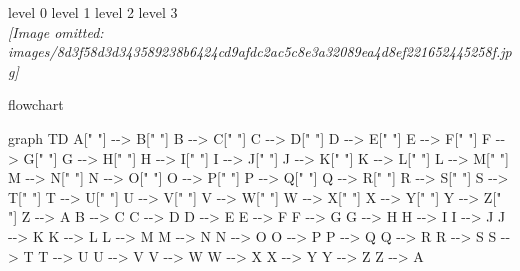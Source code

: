 \documentclass[
]{article}
\newenvironment{Shaded}{}{}
\newcommand{\NormalTok}[1]{#1}
\begin{document}
level 0 level 1 level 2 level 3\\
\textit{[Image omitted: images/8d3f58d3d343589238b6424cd9afdc2ac5c8e3a32089ea4d8ef221652445258f.jpg]}

flowchart

\begin{Shaded}
\begin{Highlighting}[]
\NormalTok{graph TD}
\NormalTok{    A[" "] {-}{-}\textgreater{} B[" "]}
\NormalTok{    B {-}{-}\textgreater{} C[" "]}
\NormalTok{    C {-}{-}\textgreater{} D[" "]}
\NormalTok{    D {-}{-}\textgreater{} E[" "]}
\NormalTok{    E {-}{-}\textgreater{} F[" "]}
\NormalTok{    F {-}{-}\textgreater{} G[" "]}
\NormalTok{    G {-}{-}\textgreater{} H[" "]}
\NormalTok{    H {-}{-}\textgreater{} I[" "]}
\NormalTok{    I {-}{-}\textgreater{} J[" "]}
\NormalTok{    J {-}{-}\textgreater{} K[" "]}
\NormalTok{    K {-}{-}\textgreater{} L[" "]}
\NormalTok{    L {-}{-}\textgreater{} M[" "]}
\NormalTok{    M {-}{-}\textgreater{} N[" "]}
\NormalTok{    N {-}{-}\textgreater{} O[" "]}
\NormalTok{    O {-}{-}\textgreater{} P[" "]}
\NormalTok{    P {-}{-}\textgreater{} Q[" "]}
\NormalTok{    Q {-}{-}\textgreater{} R[" "]}
\NormalTok{    R {-}{-}\textgreater{} S[" "]}
\NormalTok{    S {-}{-}\textgreater{} T[" "]}
\NormalTok{    T {-}{-}\textgreater{} U[" "]}
\NormalTok{    U {-}{-}\textgreater{} V[" "]}
\NormalTok{    V {-}{-}\textgreater{} W[" "]}
\NormalTok{    W {-}{-}\textgreater{} X[" "]}
\NormalTok{    X {-}{-}\textgreater{} Y[" "]}
\NormalTok{    Y {-}{-}\textgreater{} Z[" "]}
\NormalTok{    Z {-}{-}\textgreater{} A}
\NormalTok{    B {-}{-}\textgreater{} C}
\NormalTok{    C {-}{-}\textgreater{} D}
\NormalTok{    D {-}{-}\textgreater{} E}
\NormalTok{    E {-}{-}\textgreater{} F}
\NormalTok{    F {-}{-}\textgreater{} G}
\NormalTok{    G {-}{-}\textgreater{} H}
\NormalTok{    H {-}{-}\textgreater{} I}
\NormalTok{    I {-}{-}\textgreater{} J}
\NormalTok{    J {-}{-}\textgreater{} K}
\NormalTok{    K {-}{-}\textgreater{} L}
\NormalTok{    L {-}{-}\textgreater{} M}
\NormalTok{    M {-}{-}\textgreater{} N}
\NormalTok{    N {-}{-}\textgreater{} O}
\NormalTok{    O {-}{-}\textgreater{} P}
\NormalTok{    P {-}{-}\textgreater{} Q}
\NormalTok{    Q {-}{-}\textgreater{} R}
\NormalTok{    R {-}{-}\textgreater{} S}
\NormalTok{    S {-}{-}\textgreater{} T}
\NormalTok{    T {-}{-}\textgreater{} U}
\NormalTok{    U {-}{-}\textgreater{} V}
\NormalTok{    V {-}{-}\textgreater{} W}
\NormalTok{    W {-}{-}\textgreater{} X}
\NormalTok{    X {-}{-}\textgreater{} Y}
\NormalTok{    Y {-}{-}\textgreater{} Z}
\NormalTok{    Z {-}{-}\textgreater{} A}

\end{Highlighting}
\end{Shaded}
\end{document}
